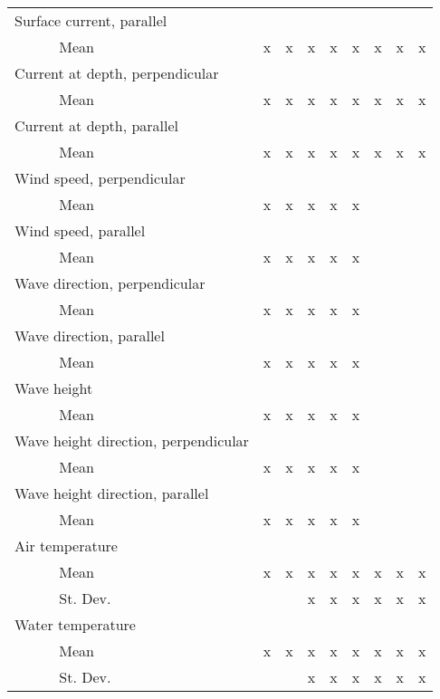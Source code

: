 \begin{table}
{\begin{minipage}{\textwidth}
\begin{tabular}{ll|cccccccc}
        \hline
        \multicolumn{2}{l|}{Surface current, parallel} &&&&&&&& \\
        & Mean & x & x & x & x & x & x & x & x \\
        \hline
        \multicolumn{2}{l|}{Current at depth, perpendicular} &&&&&&&& \\
        & Mean & x & x & x & x & x & x & x & x \\
        \hline
        \multicolumn{2}{l|}{Current at depth, parallel} &&&&&&&& \\
        & Mean & x & x & x & x & x & x & x & x \\
        \hline
        \multicolumn{2}{l|}{Wind speed, perpendicular} &&&&&&&& \\
        & Mean & x & x & x & x & x & & & \\
        \hline
        \multicolumn{2}{l|}{Wind speed, parallel} &&&&&&&& \\
        & Mean & x & x & x & x & x & & & \\
        \hline
        \multicolumn{2}{l|}{Wave direction, perpendicular} &&&&&&&& \\
        & Mean & x & x & x & x & x & & & \\
        \hline
        \multicolumn{2}{l|}{Wave direction, parallel} &&&&&&&& \\
        & Mean & x & x & x & x & x & & & \\
        \hline
        \multicolumn{2}{l|}{Wave height} &&&&&&&& \\
        & Mean & x & x & x & x & x & & & \\
        \hline
        \multicolumn{2}{l|}{Wave height direction, perpendicular} &&&&&&&& \\
        & Mean & x & x & x & x & x & & & \\
        \hline
        \multicolumn{2}{l|}{Wave height direction, parallel} &&&&&&&& \\
        & Mean & x & x & x & x & x & & & \\
        \hline
        \multicolumn{2}{l|}{Air temperature} &&&&&&&& \\
        & Mean & x & x & x & x & x & x & x & x \\
        & St. Dev. & & & x & x & x & x & x & x \\
        \hline
        \multicolumn{2}{l|}{Water temperature} &&&&&&&& \\
        & Mean & x & x & x & x & x & x & x & x \\
        & St. Dev. & & & x & x & x & x & x & x \\

\end{tabular}
\end{minipage}}
\end{table}
